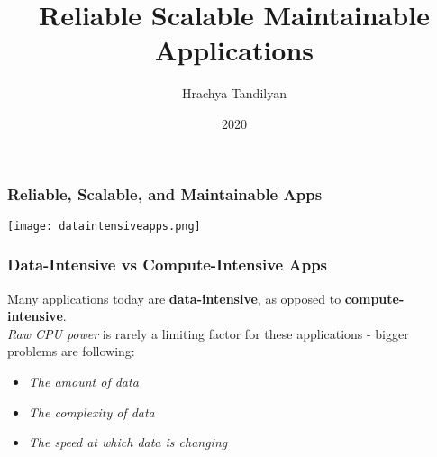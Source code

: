 \documentclass{beamer}
\begin{document}
\title[Reliable Scalable Maintainable Apps]{Reliable Scalable Maintainable Applications}
\author[Hrachya Tandilyan\copyright]{Hrachya Tandilyan}
\date{2020}

\begin{frame}
\titlepage
\end{frame}

\begin{frame}\frametitle{Reliable, Scalable, and Maintainable Apps}
\begin{center}
    \texttt{[image: dataintensiveapps.png]}
\end{center}
\end{frame}

\begin{frame}\frametitle{Data-Intensive vs Compute-Intensive Apps}

Many applications today are \textbf{data-intensive}, as opposed to \textbf{compute-intensive}.
\\ \vfill
\emph{Raw CPU power} is rarely a limiting factor for these applications - bigger problems are
following:
\vfill
\begin{itemize}
    \item \emph{The amount of data} \vfill
    \item \emph{The complexity of data} \vfill
    \item \emph{The speed at which data is changing} \vfill
\end{itemize}
\end{frame}
\end{document}

